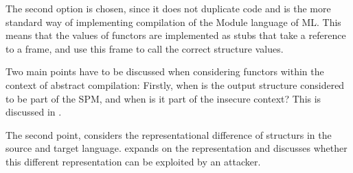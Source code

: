 \documentclass[10pt,a4paper,master=cws, masteroption=ai,english,inputenc=utf8]{kulemt}
\begin{document}
The second option is chosen, since it does not duplicate code and is the more standard way of implementing compilation of the Module language of ML.
This means that the values of functors are implemented as stubs that take 
a reference to a frame, and use this frame to call the correct structure values.

\smallskip\noindent
Two main points have to be discussed when considering functors within the context of abstract compilation:
Firstly, when is the output structure considered to be part of the SPM, and when is it part of the insecure context?
This is discussed in .

The second point, considers the representational difference of structurs in the source and target language.
 expands on the representation and discusses whether this different representation can be exploited by an attacker.
\end{document}

